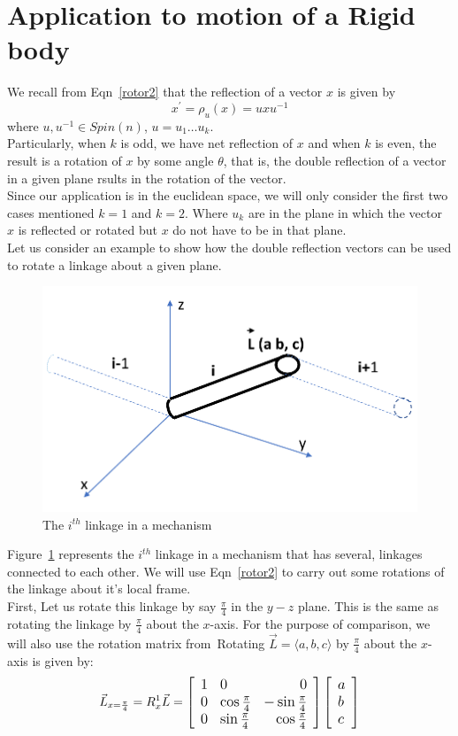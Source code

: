\documentclass[12pt,onecolumn,letterpaper]{article} %
\begin{document}
\section{Application to motion of a Rigid body}\label{apply}
We recall from Eqn~\ref{rotor2} that the reflection of a vector $x$ is given by
$$ x^'=\rho_u(x)=uxu^{-1}$$
where  $u,u^{-1}\in Spin(n)$,  $u=u_1 \dots u_k$.\\
Particularly, when $k$ is odd, we have net reflection of $x$ and when $k$ is even, the result is a rotation of $x$ by some angle $\theta$, that is, the double reflection of a vector in a given plane rsults in the rotation of the vector.\\
Since our application is in the euclidean space, we will only consider the first two cases mentioned $k=1$ and $k=2$. Where $u_k$ are in the plane in which the vector $x$ is reflected or rotated but $x$ do not have to be in that plane.\\
Let us consider an example to show how the double reflection vectors can be used to rotate a linkage about a given plane.\\
\begin{figure}[h]
\centering \includegraphics[width=0.6\linewidth]{linkage}\caption{The $i^{th}$ linkage in a mechanism} \label{linkage}
\end{figure}
Figure~\ref{linkage} represents the $i^{th}$ linkage in a mechanism that has several, linkages connected to each other. We will use Eqn~\ref{rotor2} to carry out some rotations of the linkage about it's local frame.\\
First, Let us rotate this linkage by say $\frac{\pi}{4}$ in the $y-z$ plane. This is the same as rotating the linkage by $\frac{\pi}{4}$ about the $x$-axis. For the purpose of comparison, we will also use the rotation matrix from\
Rotating $\vec{L}=\langle a,b,c\rangle$ by $\frac{\pi}{4}$ about the $x$-axis is given by:
\begin{equation*}
\vec{L}_{x=\frac{\pi}{4}}=\large{R^1_x}\vec{L}=  \left [
\begin{array}{llr}
1 & 0 & 0 \\
0 & \cos\frac{\pi}{4} & -\sin\frac{\pi}{4} \\
0 & \sin\frac{\pi}{4} & \cos\frac{\pi}{4}
\end{array} \right] \left [
\begin{array}{l}
a  \\
b  \\
c
\end{array} \right]
\end{equation*}
\end{document}
